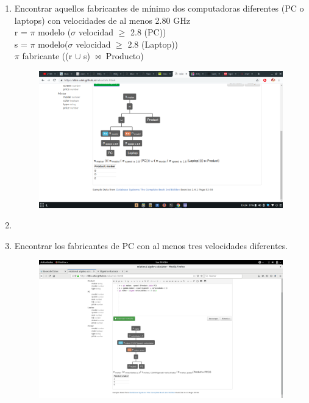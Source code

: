 \documentclass[a4paper, 12pt]{report}
\begin{document}
{\begin{enumerate}[label=\alph*)]
{\begin{figure}[H]
            {img/h.png}\hfill
    \end{figure}
}
\item{Encontrar aquellos fabricantes de mínimo dos computadoras
	diferentes (PC o laptops) con
	velocidades de al menos 2.80 GHz\\
	r = $\pi$ modelo ($\sigma$ velocidad $\geq$ 2.8 (PC))\\
    s = $\pi$ modelo($\sigma$ velocidad $\geq$ 2.8 (Laptop))\\
    $\pi$ fabricante ((r $\cup$ s) $\Join$ Producto)\\
    \begin{figure}[H]
        \includegraphics[width=\textwidth]
            {img/i.png}\hfill
    \end{figure}
}
\item{}
\item{Encontrar los fabricantes de PC con al menos tres velocidades diferentes.\\
    \begin{figure}[H]
        \includegraphics[width=\textwidth]
            {img/k.png}\hfill
    \end{figure}
}
\end{enumerate}}
\end{document}
